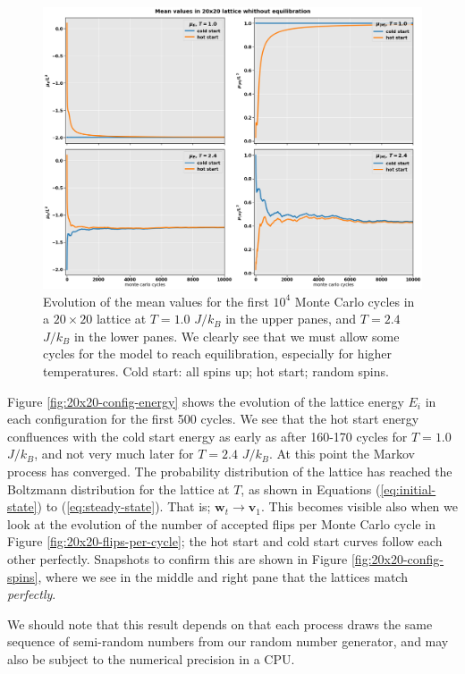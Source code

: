\documentclass[]{article}
\begin{document}
\begin{figure}[!h]
	\centering
	\includegraphics[width=1\linewidth]{./figs/20x20-wo-equilibration.png}
	\caption{Evolution of the mean values for the first $10^4$ Monte Carlo cycles in a $20 \times 20$ lattice at $T = 1.0$ $J/k_B$ in the upper panes, and $T = 2.4$ $J/k_B$ in the lower panes. We clearly see that we must allow some cycles for the model to reach equilibration, especially for higher temperatures. Cold start: all spins up; hot start; random spins.}
	\label{fig:20x20-wo-equilibration}
\end{figure}

Figure \ref{fig:20x20-config-energy} shows the evolution of the lattice energy $E_i$ in each configuration for the first 500 cycles. We see that the hot start energy confluences with the cold start energy as early as after 160-170 cycles for $T = 1.0$ $J/k_B$, and not very much later for $T = 2.4$ $J/k_B$. At this point the Markov process has converged. The probability distribution of the lattice has reached the Boltzmann distribution for the lattice at $T$, as shown in Equations (\ref{eq:initial-state}) to (\ref{eq:steady-state}). That is; $\mathbf{w}_t \rightarrow \mathbf{v}_1$. This becomes visible also when we look at the evolution of the number of accepted flips per Monte Carlo cycle in Figure \ref{fig:20x20-flips-per-cycle}; the hot start and cold start curves follow each other perfectly. Snapshots to confirm this are shown in Figure \ref{fig:20x20-config-spins}, where we see in the middle and right pane that the lattices match \textit{perfectly}. 

We should note that this result depends on that each process draws the same sequence of semi-random numbers from our random number generator, and may also be subject to the numerical precision in a CPU.
\end{document}
